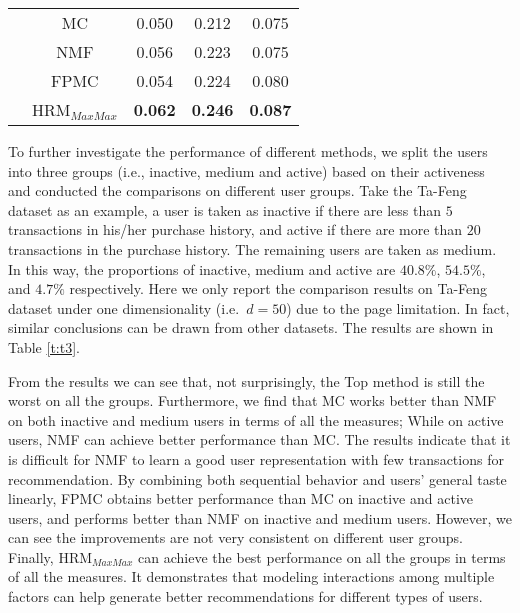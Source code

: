 \documentclass[10pt,journal,compsoc]{IEEEtran}
\begin{document}
\begin{table}[tbp]
\begin{tabular}{c|cccc}
                                                                              & MC     & 0.050    & 0.212     & 0.075 \\
                                                                              & NMF    & 0.056    & 0.223     & 0.075 \\
                                                                              & FPMC   & 0.054    & 0.224     & 0.080 \\
                                                                              & HRM$_{MaxMax}$    & \textbf{0.062}    & \textbf{0.246}     & \textbf{0.087} \\
\bottomrule
\end{tabular}
\end{table}

To further investigate the performance of different methods, we split the users into three groups (i.e., inactive, medium and active) based on their activeness and conducted the comparisons on different user groups. Take the Ta-Feng dataset as an example, a user is taken as inactive if there are less than $5$ transactions in his/her purchase history, and active if there are more than $20$ transactions in the purchase history. The remaining users are taken as medium. In this way, the proportions of inactive, medium and active are $40.8\%$, $54.5\%$, and $4.7\%$ respectively. Here we only report the comparison results on Ta-Feng dataset under one dimensionality (i.e.~$d=50$) due to the page limitation. In fact, similar conclusions can be drawn from other datasets. The results are shown in Table \ref{t:t3}.

From the results we can see that, not surprisingly, the Top method is still the worst on all the groups. Furthermore, we find that MC works better than NMF on both inactive and medium users in terms of all the measures; While on active users, NMF can achieve better performance than MC. The results indicate that it is difficult for NMF to learn a good user representation with few transactions for recommendation. By combining both sequential behavior and users' general taste linearly, FPMC obtains better performance than MC on inactive and active users, and performs better than NMF on inactive and medium users. However, we can see the improvements are not very consistent on different user groups. Finally, HRM$_{MaxMax}$ can achieve the best performance on all the groups in terms of all the measures. It demonstrates that modeling interactions among multiple factors can help generate better recommendations for different types of users.
\end{document}
